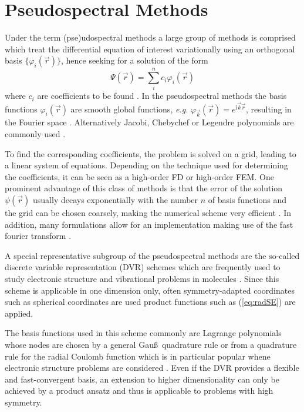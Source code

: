 {\section{Pseudospectral Methods}
\label{ch:dvr}
Under the term (pse)udospectral methods a large group of methods is comprised which treat the differential equation of interest variationally using an orthogonal basis $\{\varphi_i(\vec{r})\}$, hence seeking for a solution of the form
\begin{equation}
\Psi(\vec{r})=\sum_i^n c_i \varphi_i(\vec{r})
\end{equation}
where $c_i$ are coefficients to be found \cite{SpectMeth}.
In the pseudospectral methods the basis functions $\varphi_i(\vec{r})$ are smooth global functions, \textit{e.g.} $\varphi_{\vec{k}}(\vec{r})=e^{\text{i}\vec{k}\vec{r}}$, resulting in the Fourier space \cite{Fourier}.
Alternatively Jacobi, Chebychef or Legendre polynomials are commonly used \cite{PSbook}.

To find the corresponding coefficients, the problem is solved on a grid, leading to a linear system of equations.
Depending on the technique used for determining the coefficients, it can be seen as a high-order FD or high-order FEM.
One prominent advantage of this class of methods is that the error of the solution $\psi(\vec{r})$ usually decays exponentially with the number $n$ of basis functions and the grid can be chosen coarsely, making the numerical scheme very efficient \cite{PSbook, Tannor}.
In addition, many formulations allow for an implementation making use of the fast fourier transform \cite{PSbook}.

A special representative subgroup of the pseudospectral methods are the so-called discrete variable representation (DVR) schemes which are frequently used to study electronic structure and vibrational problems in molecules \cite{yipDVR,impLDVR,coulDVR}.
Since this scheme is applicable in one dimension only, often symmetry-adapted coordinates such as spherical coordinates are used product functions such as (\ref{eq:radSE}) are applied.

The basis functions used in this scheme commonly are Lagrange polynomials \cite{taoDVR,impLDVR,coulDVR} whose nodes are chosen by a general Gau\ss\, quadrature rule \cite{impLDVR} or from a quadrature rule for the radial Coulomb function which is in particular popular whene electronic structure problems are considered \cite{coulDVR,Tannor}.
Even if the DVR provides a flexible and fast-convergent basis, an extension to higher dimensionality can only be achieved by a product ansatz and thus is applicable to problems with high symmetry.

}

